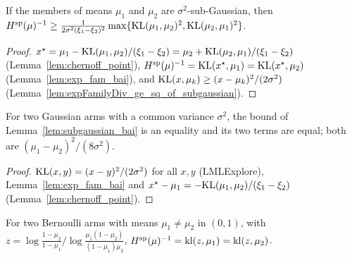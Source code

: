 \begin{lemma}[{\cite[Lemma 20]{D23}}]
  \label{lem:subgaussian_bai}
  \leanok
  If the members of means $\mu_1$ and $\mu_2$ are $\sigma^2$-sub-Gaussian, then
  $H^{\mathrm{sp}}(\mu)^{-1} \ge \frac{1}{2 \sigma^2 (\xi_1 - \xi_2)^2} \max\{\mathrm{KL}(\mu_1, \mu_2)^2, \mathrm{KL}(\mu_2,
  \mu_1)^2\}$.
\end{lemma}

\begin{proof}
  \leanok
  $x^{\star} = \mu_1 - \mathrm{KL}(\mu_1, \mu_2) / (\xi_1 - \xi_2) = \mu_2 + \mathrm{KL}(\mu_2, \mu_1) / (\xi_1 -
  \xi_2)$ (Lemma~\ref{lem:chernoff_point}), $H^{\mathrm{sp}}(\mu)^{-1} = \mathrm{KL}(x^{\star}, \mu_1) = \mathrm{KL}(x^{\star},
  \mu_2)$ (Lemma~\ref{lem:exp_fam_bai}), and $\mathrm{KL}(x, \mu_k) \ge (x - \mu_k)^2 / (2 \sigma^2)$
  (Lemma~\ref{lem:expFamilyDiv_ge_sq_of_subgaussian}).
\end{proof}

\begin{lemma}[{\cite[Lemma 20]{D23}}]
  \label{lem:gaussian_bai_two}
  \leanok
  For two Gaussian arms with a common variance $\sigma^2$, the bound of
  Lemma~\ref{lem:subgaussian_bai} is an equality and its two terms are equal; both are
  $(\mu_1 - \mu_2)^2 / (8 \sigma^2)$.
\end{lemma}

\begin{proof}
  \leanok
  $\mathrm{KL}(x, y) = (x - y)^2 / (2 \sigma^2)$ for all $x, y$ (LMLExplore), Lemma~\ref{lem:exp_fam_bai}
  and $x^{\star} - \mu_1 = -\mathrm{KL}(\mu_1, \mu_2) / (\xi_1 - \xi_2)$ (Lemma~\ref{lem:chernoff_point}).
\end{proof}

\begin{lemma}[{\cite[Lemma 9]{D23}}]
  \label{cor:bernoulli_bai_H}
  \leanok
  For two Bernoulli arms with means $\mu_1 \ne \mu_2$ in $(0, 1)$, with
  $z = \log\frac{1 - \mu_2}{1 - \mu_1} \big/ \log\frac{\mu_1 (1 - \mu_2)}{(1 - \mu_1) \mu_2}$,
  $H^{\mathrm{sp}}(\mu)^{-1} = \mathrm{kl}(z, \mu_1) = \mathrm{kl}(z, \mu_2)$.
\end{lemma}

